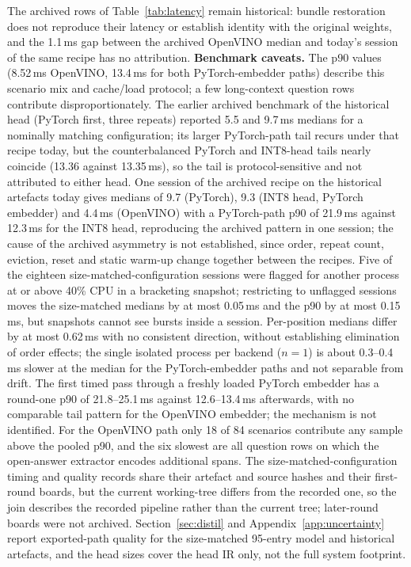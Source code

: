 The archived rows of Table~\ref{tab:latency} remain historical: bundle restoration does not reproduce their latency or establish identity with the original weights, and the 1.1\,ms gap between the archived OpenVINO median and today's session of the same recipe has no attribution. %
\textbf{Benchmark caveats.} The p90 values (8.52\,ms OpenVINO, 13.4\,ms for both PyTorch-embedder paths) describe this scenario mix and cache/load protocol; a few long-context question rows contribute disproportionately. %
The earlier archived benchmark of the historical head (PyTorch first, three repeats) reported 5.5 and 9.7\,ms medians for a nominally matching configuration; its larger PyTorch-path tail recurs under that recipe today, but the counterbalanced PyTorch and INT8-head tails nearly coincide (13.36 against 13.35\,ms), so the tail is protocol-sensitive and not attributed to either head. %
One session of the archived recipe on the historical artefacts today gives medians of 9.7 (PyTorch), 9.3 (INT8 head, PyTorch embedder) and 4.4\,ms (OpenVINO) with a PyTorch-path p90 of 21.9\,ms against 12.3\,ms for the INT8 head, reproducing the archived pattern in one session; the cause of the archived asymmetry is not established, since order, repeat count, eviction, reset and static warm-up change together between the recipes. Five of the eighteen size-matched-configuration sessions were flagged for another process at or above 40\% CPU in a bracketing snapshot; restricting to unflagged sessions moves the size-matched medians by at most 0.05\,ms and the p90 by at most 0.15\,ms, but snapshots cannot see bursts inside a session. Per-position medians differ by at most 0.62\,ms with no consistent direction, without establishing elimination of order effects; the single isolated process per backend ($n{=}1$) is about 0.3--0.4\,ms slower at the median for the PyTorch-embedder paths and not separable from drift. The first timed pass through a freshly loaded PyTorch embedder has a round-one p90 of 21.8--25.1\,ms against 12.6--13.4\,ms afterwards, with no comparable tail pattern for the OpenVINO embedder; the mechanism is not identified. For the OpenVINO path only 18 of 84 scenarios contribute any sample above the pooled p90, and the six slowest are all question rows on which the open-answer extractor encodes additional spans. The size-matched-configuration timing and quality records share their artefact and source hashes and their first-round boards, but the current working-tree  differs from the recorded one, so the join describes the recorded pipeline rather than the current tree; later-round boards were not archived. Section~\ref{sec:distil} and Appendix~\ref{app:uncertainty} report exported-path quality for the size-matched 95-entry model and historical artefacts, and the head sizes cover the head IR only, not the full system footprint. %

